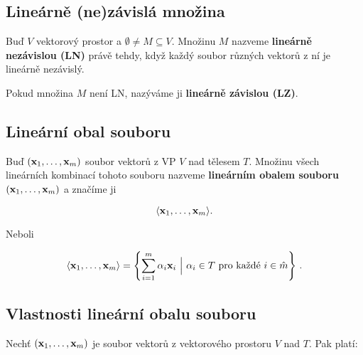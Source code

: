 \subsection*{Lineárně (ne)závislá množina}

Buď $V$ vektorový prostor a $\emptyset\neq M\subseteq V$. Množinu $M$ nazveme
\textbf{lineárně nezávislou (LN)} právě tehdy, když každý soubor různých
vektorů z ní je lineárně nezávislý.

\vspace{0.5em}

\noindent Pokud množina $M$ není LN, nazýváme ji \textbf{lineárně závislou (LZ)}.

\subsection*{Lineární obal souboru}

Buď $(\mathbf{x}_{1},\dots,\mathbf{x}_{m})$ soubor vektorů z VP $V$ nad tělesem $T$. Množinu
všech lineárních kombinací tohoto souboru nazveme \textbf{lineárním obalem
      souboru} $(\mathbf{x}_{1},\dots,\mathbf{x}_{m})$ a značíme ji

\[ \langle  \mathbf{x}_{1},\dots,\mathbf{x}_{m}  \rangle . \]

\noindent Neboli

\[ \langle  \mathbf{x}_{1},\dots,\mathbf{x}_{m}  \rangle = \left\{\sum_{i=1}^m \alpha_i \mathbf{x}_i \ \Big|\ \alpha_i\in T \text{ pro každé }i \in \hat m \right\}\,. \]

\subsection*{Vlastnosti lineární obalu souboru}

Nechť $(\mathbf{x}_1,\ldots,\mathbf{x}_m)$ je soubor vektorů z vektorového prostoru $V$ nad
$T$. Pak platí:

